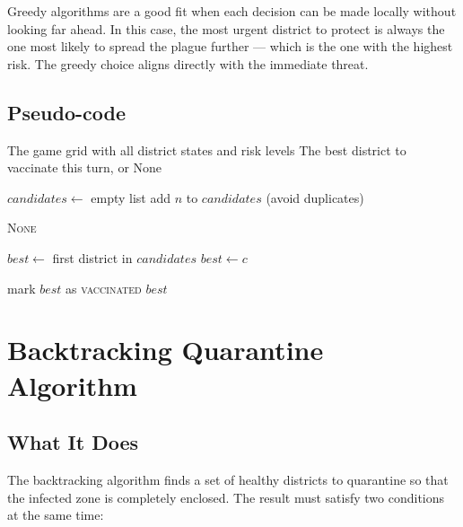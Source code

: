 \documentclass[conference]{IEEEtran}
\begin{document}
Greedy algorithms are a good fit when each decision can be made locally without
looking far ahead. In this case, the most urgent district to protect is always
the one most likely to spread the plague further — which is the one with the
highest risk. The greedy choice aligns directly with the immediate threat.

\subsection{Pseudo-code}

\begin{algorithm}[ht]
\caption{Greedy Vaccination}
\label{alg:greedy}
\begin{algorithmic}[1]
\REQUIRE The game grid with all district states and risk levels
\ENSURE The best district to vaccinate this turn, or None

\STATE $\mathit{candidates} \leftarrow$ empty list
      \STATE add $n$ to $\mathit{candidates}$ (avoid duplicates)
    \ENDIF
  \ENDFOR
\ENDFOR

  \RETURN \textsc{None}
\ENDIF

\STATE $\mathit{best} \leftarrow$ first district in $\mathit{candidates}$
    \STATE $\mathit{best} \leftarrow c$
  \ENDIF
\ENDFOR

\STATE mark $\mathit{best}$ as \textsc{vaccinated}
\RETURN $\mathit{best}$
\end{algorithmic}
\end{algorithm}

\section{Backtracking Quarantine Algorithm}

\subsection{What It Does}

The backtracking algorithm finds a set of healthy districts to quarantine so
that the infected zone is completely enclosed. The result must satisfy two
conditions at the same time:
\end{document}
